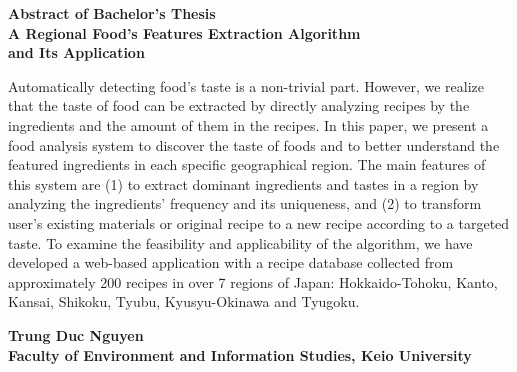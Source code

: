 \begin{center}

\begin{Large}
{\bf Abstract of Bachelor's Thesis} \\

\vspace{5mm}
{\bf A Regional Food's Features Extraction Algorithm\\ and Its Application}
\end{Large}
\end{center}

\vspace{0.4cm}
Automatically detecting food's taste is a non-trivial part. However, we realize that the taste of food can be extracted by directly analyzing recipes by the ingredients and the amount of them in the recipes. 
In this paper, we present a food analysis system to discover the taste of foods and to better understand the featured ingredients in each specific geographical region. The main features of this system are (1) to extract dominant ingredients and tastes in a region by analyzing the ingredients' frequency and its uniqueness, and (2) to transform user's existing materials or original recipe to a new recipe according to a targeted taste. To examine the feasibility and applicability of the algorithm, we have developed a web-based application with a recipe database collected from approximately 200 recipes in over 7 regions of Japan: Hokkaido-Tohoku, Kanto, Kansai, Shikoku, Tyubu, Kyusyu-Okinawa and Tyugoku. 
\vspace{-2.5mm}

\begin{flushright}
{\bf Trung Duc Nguyen}\\
\vspace{-2mm}
{\bf Faculty of Environment and Information Studies, Keio University}\\
\end{flushright}





